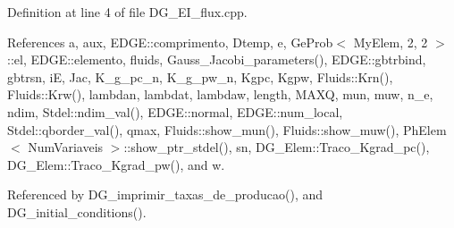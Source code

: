 Definition at line 4 of file D\+G\+\_\+\+E\+I\+\_\+flux.\+cpp.



References a, aux, E\+D\+G\+E\+::comprimento, Dtemp, e, Ge\+Prob$<$ My\+Elem, 2, 2 $>$\+::el, E\+D\+G\+E\+::elemento, fluids, Gauss\+\_\+\+Jacobi\+\_\+parameters(), E\+D\+G\+E\+::gbtrbind, gbtrsn, iE, Jac, K\+\_\+g\+\_\+pc\+\_\+n, K\+\_\+g\+\_\+pw\+\_\+n, Kgpc, Kgpw, Fluids\+::\+Krn(), Fluids\+::\+Krw(), lambdan, lambdat, lambdaw, length, M\+A\+XQ, mun, muw, n\+\_\+e, ndim, Stdel\+::ndim\+\_\+val(), E\+D\+G\+E\+::normal, E\+D\+G\+E\+::num\+\_\+local, Stdel\+::qborder\+\_\+val(), qmax, Fluids\+::show\+\_\+mun(), Fluids\+::show\+\_\+muw(), Ph\+Elem$<$ Num\+Variaveis $>$\+::show\+\_\+ptr\+\_\+stdel(), sn, D\+G\+\_\+\+Elem\+::\+Traco\+\_\+\+Kgrad\+\_\+pc(), D\+G\+\_\+\+Elem\+::\+Traco\+\_\+\+Kgrad\+\_\+pw(), and w.



Referenced by D\+G\+\_\+imprimir\+\_\+taxas\+\_\+de\+\_\+producao(), and D\+G\+\_\+initial\+\_\+conditions().

